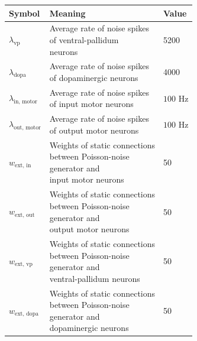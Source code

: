 \documentclass[a4paper,12pt,openright]{book}
\let\oldtable\table
\let\endoldtable\endtable
\renewenvironment{table}[1][htbp] %
{
    \oldtable[#1]
    \footnotesize                     %
}
{
    \endoldtable
}
\begin{document}
\begin{table}[htbp]
\begin{tabular}{lll}
\textbf{Symbol} & \textbf{Meaning} & \textbf{Value} \\ \hline
\(\lambda_{\text{vp}}\) & \makecell[l]{Average rate of noise spikes \\ of ventral-pallidum \\ neurons} & 5200 \\ \hline
\(\lambda_{\text{dopa}}\) & \makecell[l]{Average rate of noise spikes \\ of dopaminergic neurons} & 4000 \\ \hline
\(\lambda_{\text{in, motor}}\) & \makecell[l]{Average rate of noise spikes \\ of input motor neurons} & $100$ Hz \\ \hline
\(\lambda_{\text{out, motor}}\) & \makecell[l]{Average rate of noise spikes \\ of output motor neurons} & $100$ Hz \\ \hline
\(w_{\text{ext, in}}\) & \makecell[l]{Weights of static connections \\ between Poisson-noise \\ generator and \\ input motor neurons} & 50 \\ \hline
\(w_{\text{ext, out}}\) & \makecell[l]{Weights of static connections \\ between Poisson-noise \\ generator and \\ output motor neurons} & 50 \\ \hline
\(w_{\text{ext, vp}}\) & \makecell[l]{Weights of static connections \\ between Poisson-noise \\ generator and \\ ventral-pallidum neurons} & 50 \\ \hline
\(w_{\text{ext, dopa}}\) & \makecell[l]{Weights of static connections \\ between Poisson-noise \\ generator and \\ dopaminergic neurons} & 50 \\ \hline
\end{tabular}
\caption{Noise-generator parameters}
\label{tab:params6}
\end{table}
\newpage
\end{document}
